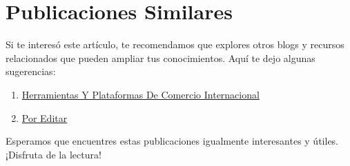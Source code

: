 \documentclass[
  jou,
  floatsintext,
  longtable,
  a4paper,
  nolmodern,
  notxfonts,
  notimes,
  colorlinks=true,linkcolor=blue,citecolor=blue,urlcolor=blue]{apa7}
\providecommand{\tightlist}{%
  \setlength{\itemsep}{0pt}\setlength{\parskip}{0pt}}
\begin{document}
\section{Publicaciones Similares}\label{publicaciones-similares}

Si te interesó este artículo, te recomendamos que explores otros blogs y
recursos relacionados que pueden ampliar tus conocimientos. Aquí te dejo
algunas sugerencias:

\begin{enumerate}
\def\labelenumi{\arabic{enumi}.}
\tightlist
\item
  \href{https://achalmaedison.netlify.app/gestion-empresarial/inteligencia-comercial/2024-05-15-herramientas-y-plataformas-de-comercio-internacional/index.pdf}{}
  \href{https://achalmaedison.netlify.app/gestion-empresarial/inteligencia-comercial/2024-05-15-herramientas-y-plataformas-de-comercio-internacional}{Herramientas
  Y Plataformas De Comercio Internacional}
\item
  \href{https://achalmaedison.netlify.app/gestion-empresarial/inteligencia-comercial/2025-03-31-por-editar/index.pdf}{}
  \href{https://achalmaedison.netlify.app/gestion-empresarial/inteligencia-comercial/2025-03-31-por-editar}{Por
  Editar}
\end{enumerate}

Esperamos que encuentres estas publicaciones igualmente interesantes y
útiles. ¡Disfruta de la lectura!
\end{document}
